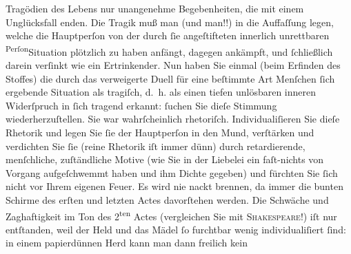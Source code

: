 \begin{ledgroupsized}[t]{13cm}
                    Tragödien des Lebens nur unangenehme Begebenheiten, die mit einem Unglücksfall
                    enden. Die Tragik muß man (und  man!!) in
                    die Auffaſſung legen, welche die Hauptperſon von der durch ſie angeſtifteten {\pb}innerlich unrettbaren \substVorne{}\textsuperscript{Perſon}{\allowbreak}\substDazwischen{}Situation\substHinten{} plötzlich zu haben anfängt, dagegen ankämpft, und ſchließlich darein
                    verſinkt wie ein Ertrinkender. Nun haben Sie einmal (beim Erfinden des Stoffes) die durch das verweigerte Duell für
                    eine beſtimmte Art Menſchen ſich ergebende Situation als tragiſch, d. h. als
                    einen tiefen unlösbaren inneren Widerſpruch in ſich tragend erkannt: {\pb}ſuchen Sie dieſe Stimmung
                    wiederherzuſtellen. Sie war wahrſcheinlich rhetoriſch. Individualiſieren Sie
                    dieſe Rhetorik und legen Sie ſie der Hauptperſon in den Mund, verſtärken und
                    verdichten Sie ſie (reine Rhetorik iſt immer dünn) durch retardierende,
                    menſchliche, zuſtändliche Motive (wie Sie in der Liebelei ein faſt-nichts von Vorgang aufgeſchwemmt haben und ihm
                    Dichte gegeben) {\pb}und fürchten
                    Sie ſich nicht vor Ihrem eigenen Feuer. Es wird nie nackt brennen, da immer die
                    bunten Schirme des erſten und letzten Actes davorſtehen werden. Die Schwäche und
                    Zaghaftigkeit im Ton des 2\textsuperscript{ten} Actes (vergleichen Sie mit \textsc{Shakeſpeare}!) iſt nur entſtanden, weil der Held und das Mädel ſo furchtbar wenig
                    individualiſiert ſind: in einem papierdünnen Herd kann man dann freilich kein

\end{ledgroupsized}

